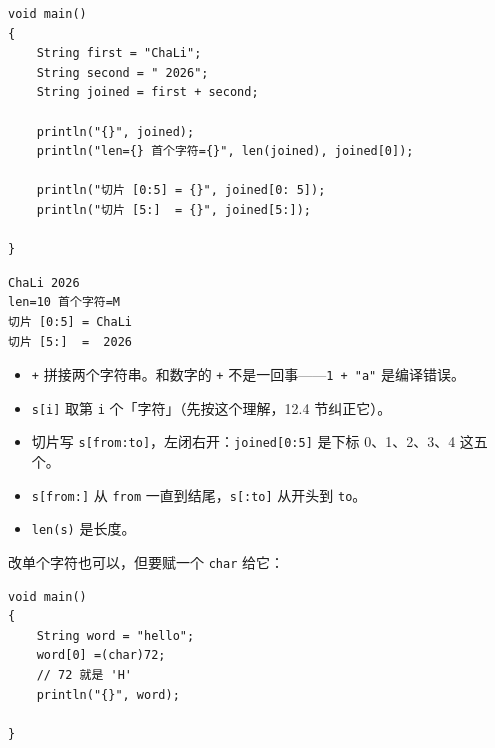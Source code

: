 \par
\medskip
\begin{lstlisting}[style=chali]
void main()
{
    String first = "ChaLi";
    String second = " 2026";
    String joined = first + second;

    println("{}", joined);
    println("len={} 首个字符={}", len(joined), joined[0]);

    println("切片 [0:5] = {}", joined[0: 5]);
    println("切片 [5:]  = {}", joined[5:]);

}
\end{lstlisting}
\par
\medskip

\par
\medskip
\begin{lstlisting}[style=out]
ChaLi 2026
len=10 首个字符=M
切片 [0:5] = ChaLi
切片 [5:]  =  2026
\end{lstlisting}
\par
\medskip

\begin{itemize}

\item \texttt{+} 拼接两个字符串。和数字的 \texttt{+} 不是一回事——\texttt{1 + "a"} 是编译错误。

\item \texttt{s[\allowbreak{}i]\allowbreak{}} 取第 \texttt{i} 个「字符」（先按这个理解，12.4 节纠正它）。

\item 切片写 \texttt{s[\allowbreak{}from:\allowbreak{}to]\allowbreak{}}，左闭右开：\texttt{joined[\allowbreak{}0:\allowbreak{}5]\allowbreak{}} 是下标 0、1、2、3、4 这五个。

\item \texttt{s[\allowbreak{}from:\allowbreak{}]\allowbreak{}} 从 \texttt{from} 一直到结尾，\texttt{s[\allowbreak{}:\allowbreak{}to]\allowbreak{}} 从开头到 \texttt{to}。

\item \texttt{len(\allowbreak{}s)\allowbreak{}} 是长度。

\end{itemize}

改单个字符也可以，但要赋一个 \texttt{char} 给它：

\par
\medskip
\begin{lstlisting}[style=chali]
void main()
{
    String word = "hello";
    word[0] =(char)72;
    // 72 就是 'H'
    println("{}", word);

}
\end{lstlisting}
\par
\medskip

